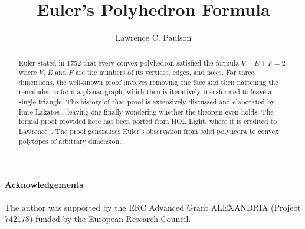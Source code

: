 \documentclass[11pt,a4paper]{article}
\begin{document}
\title{Euler's Polyhedron Formula}
\author{Lawrence C. Paulson}
\maketitle

\begin{abstract}
Euler stated in 1752 that every convex polyhedron satisfied the formula $V - E + F = 2$ 
where $V$, $E$ and $F$ are the numbers of its vertices, edges, and faces. For three dimensions,
the well-known proof involves removing one face and then flattening the remainder to form a planar graph,
which then is iteratively transformed to leave a single triangle. The history of that proof is extensively
discussed and elaborated by Imre Lakatos~\cite{lakatos}, leaving one finally wondering whether
the theorem even holds. The formal proof provided here has been ported from HOL Light, 
where it is credited to Lawrence~\cite{lawrence-short}. The proof generalises Euler's observation
from solid polyhedra to convex polytopes of arbitrary dimension.
\end{abstract}

\newpage
\tableofcontents

\paragraph*{Acknowledgements}
The author was supported by the ERC Advanced Grant ALEXANDRIA (Project 742178) funded by the European Research Council. 

\newpage





\end{document}

